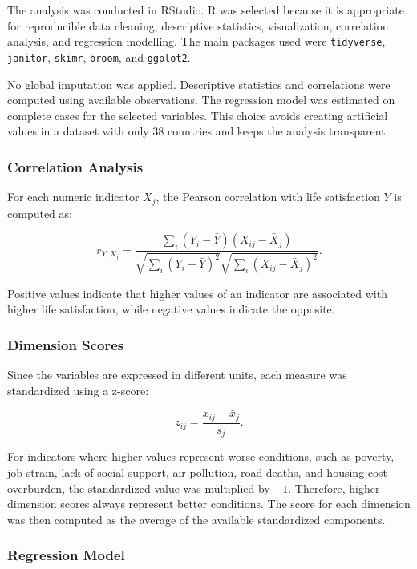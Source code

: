 \documentclass[11pt,a4paper]{article}
\begin{document}
The analysis was conducted in RStudio. R was selected because it is appropriate for reproducible data cleaning, descriptive statistics, visualization, correlation analysis, and regression modelling. The main packages used were \texttt{tidyverse}, \texttt{janitor}, \texttt{skimr}, \texttt{broom}, and \texttt{ggplot2}.

No global imputation was applied. Descriptive statistics and correlations were computed using available observations. The regression model was estimated on complete cases for the selected variables. This choice avoids creating artificial values in a dataset with only 38 countries and keeps the analysis transparent.

\subsubsection{Correlation Analysis}

For each numeric indicator $X_j$, the Pearson correlation with life satisfaction $Y$ is computed as:

\[
 r_{Y,X_j} = \frac{\sum_i (Y_i - \bar{Y})(X_{ij} - \bar{X}_j)}{\sqrt{\sum_i (Y_i - \bar{Y})^2}\sqrt{\sum_i (X_{ij} - \bar{X}_j)^2}}.
\]

Positive values indicate that higher values of an indicator are associated with higher life satisfaction, while negative values indicate the opposite.

\subsubsection{Dimension Scores}

Since the variables are expressed in different units, each measure was standardized using a z-score:

\[
 z_{ij} = \frac{x_{ij} - \bar{x}_j}{s_j}.
\]

For indicators where higher values represent worse conditions, such as poverty, job strain, lack of social support, air pollution, road deaths, and housing cost overburden, the standardized value was multiplied by $-1$. Therefore, higher dimension scores always represent better conditions. The score for each dimension was then computed as the average of the available standardized components.

\subsubsection{Regression Model}
\end{document}
